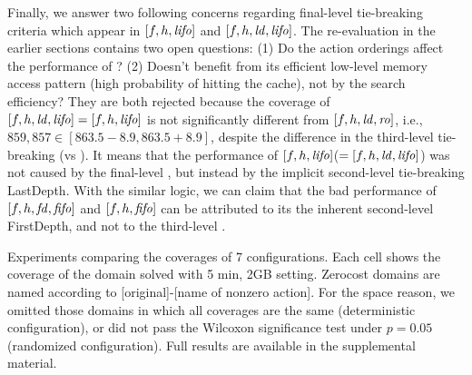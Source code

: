 Finally, we answer two following concerns regarding \lifo final-level
tie-breaking criteria which appear in $[f,h,\mbox{\textit{lifo}}]$ and
$[f,h,\mbox{\textit{ld}},\mbox{\textit{lifo}}]$. The re-evaluation in the earlier sections contains
two open questions: (1) Do the action orderings affect the performance of \lifo? 
(2) Doesn't \lifo benefit from its efficient low-level memory access pattern (high
probability of hitting the cache), not by the search efficiency?
They are both rejected because the
coverage of $[f,h,\mbox{\textit{ld}},\mbox{\textit{lifo}}]=[f,h,\mbox{\textit{lifo}}]$ is not significantly
different from $[f,h,\mbox{\textit{ld}},\mbox{\textit{ro}}]$, i.e.,
$859,857 \in [863.5-8.9,863.5+8.9]$,
despite the difference in the third-level tie-breaking (\lifo vs \ro).
% 
It means that the
performance of $[f,h,\mbox{\textit{lifo}}]$($=[f,h,\mbox{\textit{ld}},\mbox{\textit{lifo}}]$) was not caused by the final-level
\lifo, but instead by the implicit second-level tie-breaking LastDepth.
% 
With the similar logic, we can claim that the bad performance of
$[f,h,\mbox{\textit{fd}},\mbox{\textit{fifo}}]$ and $[f,h,\mbox{\textit{fifo}}]$ can be attributed to its the
inherent second-level FirstDepth, and not to the third-level \fifo.


\begin{table}[tb]
 \centering
 
 \caption{Experiments comparing the coverages of 7 configurations.
 Each cell shows the coverage of the domain solved with 5 min, 2GB
 setting. Zerocost domains are named according to
 [original]-[name of nonzero action].
 For the space reason, we omitted those domains in which all coverages are
 the same (deterministic configuration),
 or did not pass the Wilcoxon significance test under $p=0.05$ (randomized configuration).
 Full results are available in the supplemental material.
}  \label{depth}
\end{table}


